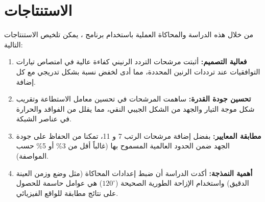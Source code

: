 \section{الاستنتاجات} \label{sec:sec5}

من خلال هذه الدراسة والمحاكاة العملية باستخدام برنامج ، يمكن تلخيص الاستنتاجات التالية:

\begin{enumerate}
    \item \textbf{فعالية التصميم:} أثبتت مرشحات التردد الرنيني  كفاءة عالية في امتصاص تيارات التوافقيات عند ترددات الرنين المحددة، مما أدى لخفض نسبة  بشكل تدريجي مع كل إضافة.
    \item \textbf{تحسين جودة القدرة:} ساهمت المرشحات في تحسين معامل الاستطاعة وتقريب شكل موجة التيار والجهد من الشكل الجيبي النقي، مما يقلل من الفواقد والحرارة في عناصر الشبكة.
    \item \textbf{مطابقة المعايير:} بفضل إضافة مرشحات الرتب 7 و 11، تمكنا من الحفاظ على جودة الجهد ضمن الحدود العالمية المسموح بها (غالباً أقل من 3\% أو 5\% حسب المواصفة).
    \item \textbf{أهمية النمذجة:} أكدت الدراسة أن ضبط إعدادات المحاكاة (مثل وضع  وزمن العينة الدقيق) واستخدام الإزاحة الطورية الصحيحة ($120^\circ$) هي عوامل حاسمة للحصول على نتائج مطابقة للواقع الفيزيائي.
\end{enumerate}
